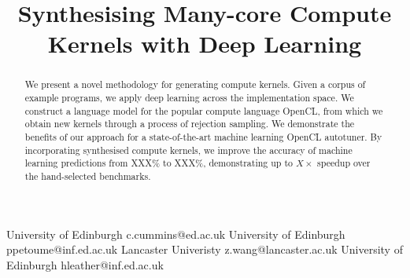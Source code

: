 \documentclass[preprint,nonatbib,10pt,nocopyrightspace]{sigplanconf}
\begin{document}
\setlength{\pdfpageheight}{\paperheight}
\setlength{\pdfpagewidth}{\paperwidth}






\title{Synthesising Many-core Compute Kernels with Deep Learning}


           {University of Edinburgh}
           {c.cummins@ed.ac.uk}
           {University of Edinburgh}
           {ppetoume@inf.ed.ac.uk}
           {Lancaster Univeristy}
           {z.wang@lancaster.ac.uk}
           {University of Edinburgh}
           {hleather@inf.ed.ac.uk}

\maketitle

\begin{abstract}
  We present a novel methodology for generating compute kernels. Given
  a corpus of example programs, we apply deep learning across the
  implementation space. We construct a language model for the popular
  compute language OpenCL, from which we obtain new kernels through a
  process of rejection sampling. %
  We demonstrate the benefits of our approach for a state-of-the-art
  machine learning OpenCL autotuner. By incorporating synthesised
  compute kernels, we improve the accuracy of machine learning
  predictions from XXX\% to XXX\%, demonstrating up to $X\times$
  speedup over the hand-selected benchmarks.
\end{abstract}
\end{document}
